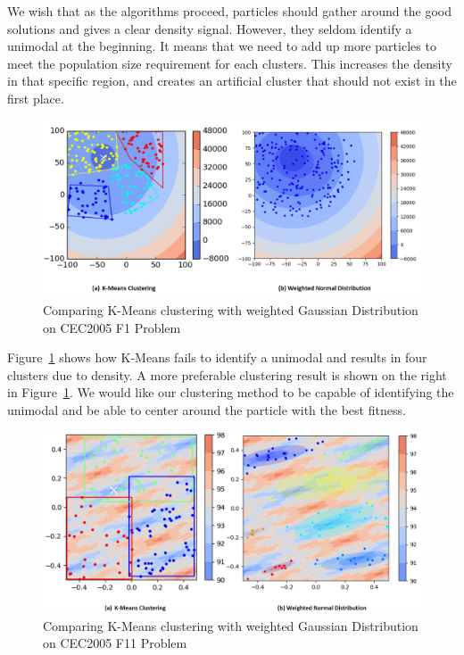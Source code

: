 We wish that as the algorithms proceed, particles should gather around the good solutions and gives a clear density signal.
However, they seldom identify a unimodal at the beginning.
It means that we need to add up more particles to meet the population size requirement for each clusters.
This increases the density in that specific region, and creates an artificial cluster that should not exist in the first place.

\begin{figure} 
\centering
\includegraphics[width=\textwidth]{Clustering_comparison} 
\caption{Comparing K-Means clustering with weighted Gaussian Distribution on CEC2005 F1 Problem}\label{fig:Clustering_comparison}
\end{figure}

Figure~\ref{fig:Clustering_comparison} shows how K-Means fails to identify a unimodal and results in four clusters due to density.
A more preferable clustering result is shown on the right in Figure~\ref{fig:Clustering_comparison}.
We would like our clustering method to be capable of identifying the unimodal 
and be able to center around the particle with the best fitness.

\begin{figure}
\centering
\includegraphics[width=\textwidth]{Clustering_comparison_F11}
\caption{Comparing K-Means clustering with weighted Gaussian Distribution on CEC2005 F11 Problem}\label{fig:Clustering_comparison_F11}
\end{figure}

